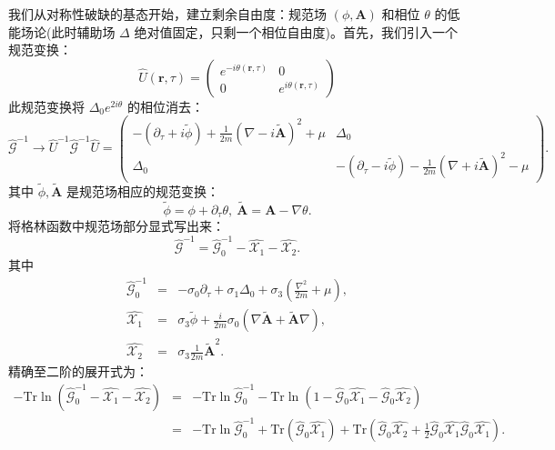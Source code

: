 \documentclass[10pt,UTF8]{ctexart}
\begin{document}
我们从对称性破缺的基态开始，建立剩余自由度：规范场 $(\phi, \bm A)$ 和相位 $\theta$ 的低能场论(此时辅助场 $\Delta$ 绝对值固定，只剩一个相位自由度)。首先，我们引入一个规范变换：
\begin{equation}
	\hat U(\bm r,\tau) = \left(
	\begin{array}{cc}
		e^{-i\theta(\bm r,\tau)} & 0 \\
		0 & e^{i\theta(\bm r,\tau)}
	\end{array}
	\right)
\end{equation}
此规范变换将 $\Delta_0 e^{2i\theta}$ 的相位消去：
\begin{equation}
	\hat{\mathcal G}^{-1} \rightarrow \hat U^{-1} \hat{\mathcal G}^{-1} \hat U = \left( 
	\begin{array}{cc}
		-(\partial_\tau+i\tilde\phi)+\frac{1}{2m}(\nabla-i\tilde{\bm A})^2+\mu & \Delta_0 \\
		\Delta_0 & -(\partial_\tau-i\tilde\phi)-\frac{1}{2m}(\nabla+i\tilde{\bm A})^2-\mu
	\end{array}
	\right).
\end{equation}
其中 $\tilde \phi, \tilde{\bm A}$ 是规范场相应的规范变换：
\begin{equation}
	\tilde \phi = \phi+\partial_\tau \theta,\ \tilde{\bm A}=\bm A-\nabla\theta.
\end{equation}
将格林函数中规范场部分显式写出来：
\begin{equation}
	\hat{\mathcal G}^{-1} = \hat{\mathcal G}^{-1}_0 - \hat{\mathcal X_1} - \hat{\mathcal X_2}.
\end{equation}
其中
\begin{eqnarray}
	\hat{\mathcal G}^{-1}_0 &=& -\sigma_0 \partial_\tau+\sigma_1 \Delta_0+\sigma_3\left(\frac{\nabla^2}{2m}+\mu \right), \\
	\hat{\mathcal X_1} &=& \sigma_3 \tilde\phi +\frac{i}{2m} \sigma_0(\nabla\tilde{\bm A}+\tilde{\bm A} \nabla), \\
	\hat{\mathcal X_2} &=& \sigma_3 \frac{1}{2m} \tilde{\bm A}^2.
\end{eqnarray}
精确至二阶的展开式为：
\begin{eqnarray}
	-\mathrm{Tr}\ln\left(\hat{\mathcal G}_0^{-1}- \hat{\mathcal X_1}-\hat{\mathcal X_2} \right)
	&=& -\mathrm{Tr}\ln\hat{\mathcal G}_0^{-1}-\mathrm{Tr}\ln\left(1 - \hat{\mathcal G}_0 \hat{\mathcal X_1}- \hat{\mathcal G}_0 \hat{\mathcal X_2} \right) \nonumber \\
	&=& -\mathrm{Tr}\ln\hat{\mathcal G}_0^{-1} + \mathrm{Tr}\left(\hat{\mathcal G}_0 \hat{\mathcal X_1} \right) + \mathrm{Tr}\left(\hat{\mathcal G}_0 \hat{\mathcal X_2}+\frac{1}{2}\hat{\mathcal G}_0 \hat{\mathcal X_1} \hat{\mathcal G}_0 \hat{\mathcal X_1} \right).
\end{eqnarray}
\end{document}
